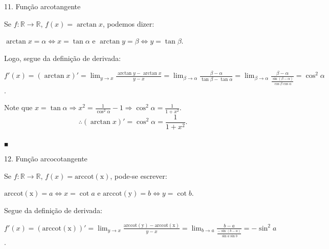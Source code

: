 \documentclass{article}
\begin{document}
{\begin{newpage}
\vspace{0.3cm}
\begin{flushleft}
11. Função arcotangente
\end{flushleft}
\par Se $f:\mathbb{R}\rightarrow\mathbb{R}$, $f(x)=\arctan{x}$, podemos dizer:
\par \begin{center} $\arctan{x}=\alpha\Leftrightarrow x=\tan{\alpha }$ e  $\arctan{y}=\beta\Leftrightarrow y=\tan{\beta }$.\end{center}
\vspace{0.3cm}
\par Logo, segue da definição de derivada:
\par $f'(x)=(\arctan{x})'=\displaystyle{\lim_{y\to x}} \frac{\arctan{y} - \arctan{x}}{y-x} = \displaystyle{\lim_{\beta\to \alpha }} \frac{\beta - \alpha }{\tan{\beta } - \tan{\alpha }} = \displaystyle{\lim_{\beta\to \alpha }} \frac{\beta - \alpha }{\frac{\sin{(\beta - \alpha )}}{\cos{\beta }\cos{\alpha }}} = \cos^2{\alpha }$.
\vspace{0.3cm}
\par Note que $x=\tan{\alpha }\Rightarrow x^2=\displaystyle{\frac{1}{\cos^2{\alpha }} - 1 \Rightarrow \cos^2{\alpha }=\frac{1}{1+x^2}}$.
\vspace{0.3cm}
$$\therefore (\arctan{x})'=\cos^2{\alpha }=\frac{1}{1+x^2}.$$
\begin{flushright} $_{\blacksquare }$ \end{flushright}
\par
\vspace{0.3cm}
\begin{flushleft}
12. Função arcocotangente
\end{flushleft}
\par Se $f:\mathbb{R}\rightarrow\mathbb{R}$, $f(x)=\operatorname{arccot(x)}$, pode-se escrever:
\par \begin{center} $\operatorname{arccot(x)}=a\Leftrightarrow x=\cot{a}$ e $\operatorname{arccot(y)}=b\Leftrightarrow y=\cot{b}$.\end{center}
\vspace{0.3cm}
\par Segue da definição de derivada:
\par $f'(x)=(\operatorname{arccot(x)})'=\displaystyle{\lim_{y\to x}} \frac{\operatorname{arccot(y)} - \operatorname{arccot(x)}}{y-x} = \displaystyle{\lim_{b\to a}} \frac{b-a}{\frac{-\sin{(b-a)}}{\sin{a}\sin{b}}} = -\sin^2{a}$.
\vspace{0.3cm}

\end{newpage}}
\end{document}
